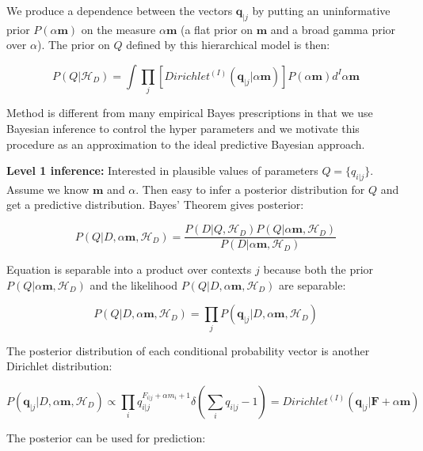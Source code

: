 \noindent We produce a dependence between the vectors $\boldsymbol{q}_{|j}$ by putting an uninformative prior $P(\alpha\boldsymbol{m})$ on the measure $\alpha\boldsymbol{m}$ (a flat prior on $\boldsymbol{m}$ and a broad gamma prior over $\alpha$). The prior on $Q$ defined by this hierarchical model is then:

\begin{equation}
P(Q|\mathscr{H}_{D})=\int\prod_{j}[Dirichlet^{(I)}(\boldsymbol{q}_{|j}|\alpha\boldsymbol{m})]P(\alpha\boldsymbol{m})d^{I}\alpha\boldsymbol{m}
\end{equation}

Method is different from many empirical Bayes prescriptions in that we use Bayesian inference to control the hyper parameters and we motivate this procedure as an approximation to the ideal predictive Bayesian approach.

\textbf{Level 1 inference: } Interested in plausible values of parameters $Q=\{q_{i|j}\}$. Assume we know $\boldsymbol{m}$ and $\alpha$. Then easy to infer a posterior distribution for $Q$ and get a predictive distribution. Bayes' Theorem gives posterior:

\begin{equation}
P(Q|D, \alpha\boldsymbol{m}, \mathscr{H}_{D})=\frac{P(D|Q,\mathscr{H}_{D})P(Q|\alpha\boldsymbol{m}, \mathscr{H}_{D})}{P(D|\alpha\boldsymbol{m}, \mathscr{H}_{D})}
\end{equation}

\noindent Equation is separable into a product over contexts $j$ because both the prior $P(Q|\alpha\boldsymbol{m}, \mathscr{H}_{D})$ and the likelihood $P(Q|D, \alpha\boldsymbol{m}, \mathscr{H}_{D})$ are separable:

\begin{equation}
P(Q|D, \alpha\boldsymbol{m}, \mathscr{H}_{D})=\prod_{j}P(\boldsymbol{q}_{|j}|D, \alpha\boldsymbol{m}, \mathscr{H}_{D})
\end{equation}

\noindent The posterior distribution of each conditional probability vector is another Dirichlet distribution:

\begin{equation}
P(\boldsymbol{q}_{|j}|D, \alpha\boldsymbol{m}, \mathscr{H}_{D})\propto \prod_{i}q_{i|j}^{F_{i|j}+\alpha m_{i}+1}\delta\left(\sum_{i}q_{i|j}-1\right)=Dirichlet^{(I)}(\boldsymbol{q}_{|j}|\boldsymbol{F}+\alpha\boldsymbol{m})
\end{equation}

\noindent The posterior can be used for prediction:

